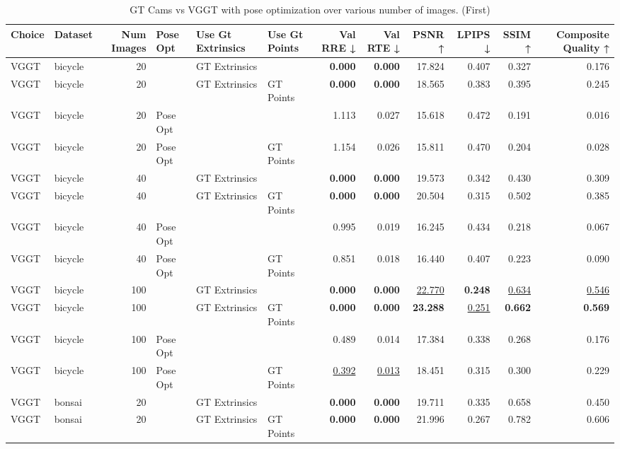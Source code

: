 \begin{table}[H]
\caption{GT Cams vs VGGT with pose optimization over various number of images. (First)}
\label{tab:01_num_images_gt_cams_first}
\centering
\scriptsize
\begin{tabular}{llrlllrrrrrr}
\toprule
Choice & Dataset & Num Images & Pose Opt & Use Gt Extrinsics & Use Gt Points & Val RRE ↓ & Val RTE ↓ & PSNR ↑ & LPIPS ↓ & SSIM ↑ & Composite Quality ↑ \\
\midrule
VGGT & bicycle & 20 &  & GT Extrinsics &  & \textbf{0.000} & \textbf{0.000} & 17.824 & 0.407 & 0.327 & 0.176 \\
VGGT & bicycle & 20 &  & GT Extrinsics & GT Points & \textbf{0.000} & \textbf{0.000} & 18.565 & 0.383 & 0.395 & 0.245 \\
VGGT & bicycle & 20 & Pose Opt &  &  & 1.113 & 0.027 & 15.618 & 0.472 & 0.191 & 0.016 \\
VGGT & bicycle & 20 & Pose Opt &  & GT Points & 1.154 & 0.026 & 15.811 & 0.470 & 0.204 & 0.028 \\
VGGT & bicycle & 40 &  & GT Extrinsics &  & \textbf{0.000} & \textbf{0.000} & 19.573 & 0.342 & 0.430 & 0.309 \\
VGGT & bicycle & 40 &  & GT Extrinsics & GT Points & \textbf{0.000} & \textbf{0.000} & 20.504 & 0.315 & 0.502 & 0.385 \\
VGGT & bicycle & 40 & Pose Opt &  &  & 0.995 & 0.019 & 16.245 & 0.434 & 0.218 & 0.067 \\
VGGT & bicycle & 40 & Pose Opt &  & GT Points & 0.851 & 0.018 & 16.440 & 0.407 & 0.223 & 0.090 \\
VGGT & bicycle & 100 &  & GT Extrinsics &  & \textbf{0.000} & \textbf{0.000} & \underline{22.770} & \textbf{0.248} & \underline{0.634} & \underline{0.546} \\
VGGT & bicycle & 100 &  & GT Extrinsics & GT Points & \textbf{0.000} & \textbf{0.000} & \textbf{23.288} & \underline{0.251} & \textbf{0.662} & \textbf{0.569} \\
VGGT & bicycle & 100 & Pose Opt &  &  & 0.489 & 0.014 & 17.384 & 0.338 & 0.268 & 0.176 \\
VGGT & bicycle & 100 & Pose Opt &  & GT Points & \underline{0.392} & \underline{0.013} & 18.451 & 0.315 & 0.300 & 0.229 \\
\midrule
VGGT & bonsai & 20 &  & GT Extrinsics &  & \textbf{0.000} & \textbf{0.000} & 19.711 & 0.335 & 0.658 & 0.450 \\
VGGT & bonsai & 20 &  & GT Extrinsics & GT Points & \textbf{0.000} & \textbf{0.000} & 21.996 & 0.267 & 0.782 & 0.606 \\

\end{tabular}
\end{table}

